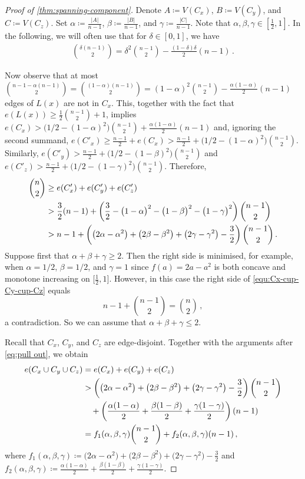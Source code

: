 \documentclass[10pt,a4paper]{amsart}
\newcommand{\abs}[1]{\left\lvert#1\right\rvert}
\newcommand{\al}{\alpha}
\newcommand{\be}{\beta}
\newcommand{\ce}{\gamma}
\begin{document}
\begin{proof}[Proof of \cref{thm:spanning-component}]
		Denote $A \coloneq V(C_x)$, $B\coloneq V(C_y)$, and $C \coloneq V(C_z)$.
		Set $\al \coloneq\frac{\abs A}{n-1}$, $\be\coloneq\frac{\abs B}{n-1}$, and $\ce\coloneq\frac{\abs C}{n-1}$. Note that $\al,\be,\ce\in[\frac12,1]$. In the following, we will often use that for $\delta\in[0,1]$, we have
		\begin{align}\label{eq:pull out}
			\binom{\delta(n-1)}{2}=\delta^2\binom{n-1}{2}-\frac{(1-\delta)\delta}{2}(n-1) \,.
		\end{align}
		
		Now observe that at most $\binom{n-1-\al(n-1)}{2} =\binom{(1-\al)(n-1)}{2}= (1-\alpha)^2\binom{n-1}{2}-\frac{\alpha(1-\alpha)}2(n-1)$ edges of $L(x)$ are not in $C_x$.
		This, together with the fact that $e(L(x))\ge \frac{1}{2}\binom{n-1}{2}+1$, implies $e(C_x) > \big(1/2 - (1-\al)^2\big)\binom{n-1}{2}+\frac{\alpha(1-\alpha)}2(n-1)$ and, ignoring the second summand,  $e(C'_x)\ge \frac{n-1}{2}+e(C_x)>\frac{n-1}{2}+ \big(1/2 - (1-\al)^2\big)\binom{n-1}{2}$. Similarly, $e(C'_y)>\frac{n-1}{2}+ \big(1/2 - (1-\be)^2\big)\binom{n-1}{2}$ and $e(C'_z)>\frac{n-1}{2}+ \big(1/2 - (1-\ce)^2\big)\binom{n-1}{2}$.
		Therefore,
		\begin{align}
			\binom n2 &\ge e(C_x')+e(C_y')+e(C_z')\notag\\&>\frac{3}{2}(n-1)+\left(\frac{3}{2}-\big(1-\al\big)^2-\big(1-\be\big)^2-\big(1-\ce\big)^2\right)\binom{n-1}{2}\notag\\\label{equ:Cx-cup-Cy-cup-Cz}
			&>n-1+\left(\big(2\al-\al^2\big)+\big(2\be-\be^2\big)+\big(2\ce-\ce^2\big)-\frac{3}{2}\right)\binom{n-1}{2}\,.
		\end{align}
		Suppose first that $\al+\be+\ce\geq 2$.
		Then the right side is minimised, for example, when $\al=1/2$, $\be=1/2$, and $\ce=1$ since $f(a)=2a-a^2$ is both concave and monotone increasing on $\big[\frac{1}{2},1\big]$. However, in this case the right side of \eqref{equ:Cx-cup-Cy-cup-Cz} equals 
		\[n-1+\binom{n-1}{2}=\binom{n}{2}\,,\]
		a contradiction. So we can assume that $\al+\be+\ce\leq 2$.
		
		Recall that $C_x$, $C_y$, and $C_z$ are edge-disjoint.
		Together with the arguments after \eqref{eq:pull out}, we obtain
		\begin{align}
			\label{equ:Cx-cup-Cy-cup-Cz-noprime}
			e(C_x \cup C_y \cup C_z) &= e(C_x)+e(C_y)+e(C_z) \notag \\&> \left(\big(2\al-\al^2\big)+\big(2\be-\be^2\big)+\big(2\ce-\ce^2\big)-\frac{3}{2}\right)\binom{n-1}{2}\notag\\
			&\quad+\left(\frac{\alpha(1-\alpha)}{2}+\frac{\beta(1-\beta)}{2}+\frac{\gamma(1-\gamma)}{2}\right)(n-1)\notag\\
			&=f_1(\alpha,\beta,\gamma)\binom{n-1}{2}+f_2(\alpha,\beta,\gamma)(n-1)\,,
		\end{align}
		where $f_1(\alpha,\beta,\gamma)\coloneq \big(2\al-\al^2\big)+\big(2\be-\be^2\big)+\big(2\ce-\ce^2\big)-\frac{3}{2}$ and $f_2(\alpha,\beta,\gamma)\coloneq \frac{\alpha(1-\alpha)}{2}+\frac{\beta(1-\beta)}{2}+\frac{\gamma(1-\gamma)}{2}$.
		

\end{proof}
\end{document}
